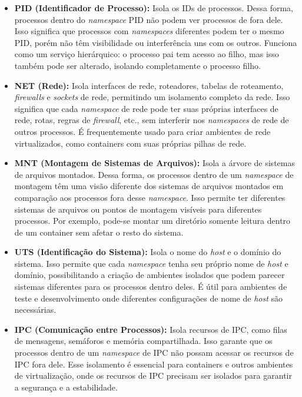\begin{itemize}
  \item \textbf{PID (Identificador de Processo):} Isola os IDs de processos. Dessa forma, processos dentro do \textit{namespace} PID não podem ver processos de fora dele. Isso significa que processos com \textit{namespaces} diferentes podem ter o mesmo PID, porém não têm visibilidade ou interferência uns com os outros. Funciona como um serviço hierárquico: o processo pai tem acesso ao filho, mas isso também pode ser alterado, isolando completamente o processo filho.
  
  \item \textbf{NET (Rede):} Isola interfaces de rede, roteadores, tabelas de roteamento, \textit{firewalls} e \textit{sockets} de rede, permitindo um isolamento completo da rede. Isso significa que cada \textit{namespace} de rede pode ter suas próprias interfaces de rede, rotas, regras de \textit{firewall}, etc., sem interferir nos \textit{namespaces} de rede de outros processos. É frequentemente usado para criar ambientes de rede virtualizados, como containers com suas próprias pilhas de rede.
  
  \item \textbf{MNT (Montagem de Sistemas de Arquivos):} Isola a árvore de sistemas de arquivos montados. Dessa forma, os processos dentro de um \textit{namespace} de montagem têm uma visão diferente dos sistemas de arquivos montados em comparação aos processos fora desse \textit{namespace}. Isso permite ter diferentes sistemas de arquivos ou pontos de montagem visíveis para diferentes processos. Por exemplo, pode-se montar um diretório somente leitura dentro de um container sem afetar o resto do sistema.
  
  \item \textbf{UTS (Identificação do Sistema):} Isola o nome do \textit{host} e o domínio do sistema. Isso permite que cada \textit{namespace} tenha seu próprio nome de \textit{host} e domínio, possibilitando a criação de ambientes isolados que podem parecer sistemas diferentes para os processos dentro deles. É útil para ambientes de teste e desenvolvimento onde diferentes configurações de nome de \textit{host} são necessárias.
  
  \item \textbf{IPC (Comunicação entre Processos):} Isola recursos de IPC, como filas de mensagens, semáforos e memória compartilhada. Isso garante que os processos dentro de um \textit{namespace} de IPC não possam acessar os recursos de IPC fora dele. Esse isolamento é essencial para containers e outros ambientes de virtualização, onde os recursos de IPC precisam ser isolados para garantir a segurança e a estabilidade.
  

\end{itemize}

